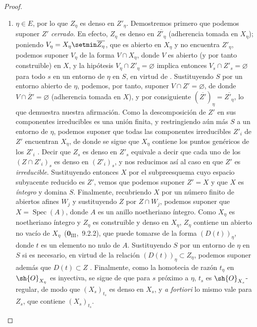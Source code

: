 \begin{proof}
\begin{enumerate}[label=\upshape{$\arabic{enumi}^\circ$}]
  \item\label{IV.9.5.3.case2} $\eta\in E$, por lo que $Z_\eta$ es denso en $Z'_\eta$.
  Demostremos primero que podemos suponer $Z'$ \emph{cerrado}.
  En efecto, $Z_\eta$ es denso en $\overline{Z'_\eta}$ (adherencia tomada en $X_\eta$); poniendo $V_\eta=X_\eta\setmin\overline{Z_\eta}$, que es abierto en $X_\eta$ y no encuentra $Z'_\eta$, podemos suponer $V_\eta$ de la forma $V\cap X_\eta$, donde $V$ es abierto (y por tanto construible) en $X$, y la hipótesis $V_\eta\cap Z'_\eta=\varnothing$ implica entonces $V_s\cap Z'_s=\varnothing$ para todo $s$ en un entorno de $\eta$ en $S$, en virtud de .
  Sustituyendo $S$ por un entorno abierto de $\eta$, podemos, por tanto, suponer $V\cap Z'=\varnothing$, de donde $V\cap\overline Z'=\varnothing$ (adherencia tomada en $X$), y por consiguiente $(\overline{Z'})_\eta=\overline{Z'_\eta}$, lo que demuestra nuestra afirmación.
  Como la descomposición de $Z'$ en sus componentes irreducibles es una unión finita, y restringiendo aún más $S$ a un entorno de $\eta$, podemos suponer que todas las componentes irreducibles $Z'_i$ de $Z'$ encuentran $X_\eta$, de donde se sigue que $X_\eta$ contiene los puntos genéricos de los $Z'_i$ .
  Decir que $Z_s$ es denso en $Z'_s$ equivale a decir que cada uno de los $(Z\cap Z'_i)_s$ es denso en $(Z'_i)_s$, y nos reducimos así al caso en que $Z'$ es \emph{irreducible}.
  Sustituyendo entonces $X$ por el subpreesquema cuyo espacio subyacente reducido es $Z'$, vemos que podemos suponer $Z'=X$ y que $X$ es \emph{íntegro} y domina $S$.
  Finalmente, recubriendo $X$ por un número finito de abiertos afines $W_j$ y sustituyendo $Z$ por $Z\cap W_j$, podemos suponer que $X=\operatorname{Spec}(A)$, donde $A$ es un anillo noetheriano íntegro.
  Como $X_\eta$ es noetheriano íntegro y $Z_\eta$ es construible y denso en $X_\eta$, $Z_\eta$ contiene un abierto no vacío de $X_\eta$~($\mathbf{0}_{\mathrm{III}}$,~9.2.2), que puede tomarse de la forma $(D(t))_\eta$, donde $t$ es un elemento no nulo de $A$.
  Sustituyendo $S$ por un entorno de $\eta$ en $S$ si es necesario, en virtud de la relación $(D(t))_\eta\subset Z_\eta$, podemos suponer además que $D(t)\subset Z$ .
  Finalmente, como la homotecia de razón $t_\eta$ en $\sh{O}_{X_\eta}$ es inyectiva, se sigue de  que para $s$ próximo a $\eta$, $t_s$ es $\sh{O}_{X_s}$-regular, de modo que $(X_s)_{t_s}$ es denso en $X_s$, y \emph{a fortiori} lo mismo vale para $Z_s$, que contiene $(X_s)_{t_s}$.
\end{enumerate}
\end{proof}

